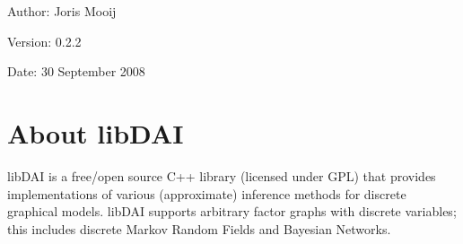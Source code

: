 \begin{Desc}
\item[Author:]Joris Mooij \end{Desc}
\begin{Desc}
\item[Version:]0.2.2 \end{Desc}
\begin{Desc}
\item[Date:]30 September 2008\end{Desc}
\hypertarget{index_about}{}\section{About libDAI}\label{index_about}
libDAI is a free/open source C++ library (licensed under GPL) that provides implementations of various (approximate) inference methods for discrete graphical models. libDAI supports arbitrary factor graphs with discrete variables; this includes discrete Markov Random Fields and Bayesian Networks.

